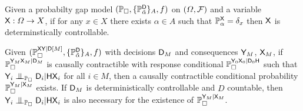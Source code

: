\begin{definition}
Given a probabilty gap model $(\mathbb{P}_\square,\{\mathbb{P}_{\tilde{\alpha}}^{\mathsf{D}}\}_A,f)$ on $(\Omega,\mathcal{F})$ and a variable $\mathsf{X}:\Omega\to X$, if for any $x\in X$ there exists $\alpha\in A$ such that $\mathbb{P}_\alpha^{\mathsf{X}}=\delta_x$ then $\mathsf{X}$ is determinstically controllable.
\end{definition}

\begin{theorem}\label{lem:proxy_control}
Given $(\mathbb{P}_\square^{\mathsf{XY}|\mathsf{D}[M]},\{\mathbb{P}_{\tilde{\alpha}}^{\mathsf{D}}\}_A,f)$ with decisions $\mathsf{D}_M$ and consequences $\mathsf{Y}_M$, $\mathsf{X}_M$, if $\mathbb{P}_\square^{\mathsf{Y}_M\mathsf{X}_M|\mathsf{D}_M}$ is causally contractible with response conditional $\mathbb{P}_\square^{\mathsf{Y}_0\mathsf{X}_0|\mathsf{D}_0\mathsf{H}}$ such that $\RV{Y}_i\CI_{\prob{P}_\square} \RV{D}_i|\RV{HX}_i$ for all $i\in M$, then a causally contractible conditional probability $\mathbb{P}_\square^{\mathsf{Y}_M|\mathsf{X}_M}$ exists. If $\mathsf{D}_M$ is deterministically controllable and $D$ countable, then $\RV{Y}_i\CI_{\prob{P}_\square} \RV{D}_i|\RV{HX}_i$ is also necessary for the existence of $\mathbb{P}_\square^{\mathsf{Y}_M|\mathsf{X}_M}$.
\end{theorem}

